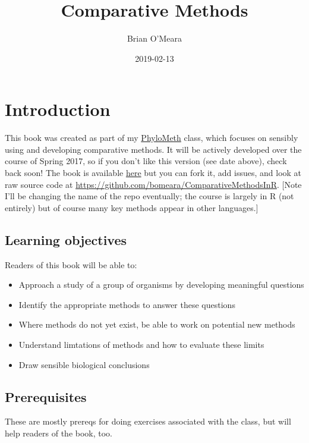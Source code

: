 \documentclass[]{article}
\title{Comparative Methods}
\author{Brian O'Meara}
\date{2019-02-13}
\providecommand{\tightlist}{%
  \setlength{\itemsep}{0pt}\setlength{\parskip}{0pt}}
\begin{document}
\maketitle

{
\setcounter{tocdepth}{2}
\tableofcontents
}
\hypertarget{introduction}{%
\section{Introduction}\label{introduction}}

This book was created as part of my \href{http://phylometh.info}{PhyloMeth} class, which focuses on sensibly using and developing comparative methods. It will be actively developed over the course of Spring 2017, so if you don't like this version (see date above), check back soon! The book is available \href{https://bookdown.org/bomeara/comparative-methods/}{here} but you can fork it, add issues, and look at raw source code at \url{https://github.com/bomeara/ComparativeMethodsInR}. {[}Note I'll be changing the name of the repo eventually; the course is largely in R (not entirely) but of course many key methods appear in other languages.{]}

\hypertarget{learning-objectives}{%
\subsection{Learning objectives}\label{learning-objectives}}

Readers of this book will be able to:

\begin{itemize}
\tightlist
\item
  Approach a study of a group of organisms by developing meaningful questions
\item
  Identify the appropriate methods to answer these questions
\item
  Where methods do not yet exist, be able to work on potential new methods
\item
  Understand limtations of methods and how to evaluate these limits
\item
  Draw sensible biological conclusions
\end{itemize}

\hypertarget{prerequisites}{%
\subsection{Prerequisites}\label{prerequisites}}

These are mostly prereqs for doing exercises associated with the class, but will help readers of the book, too.
\end{document}
